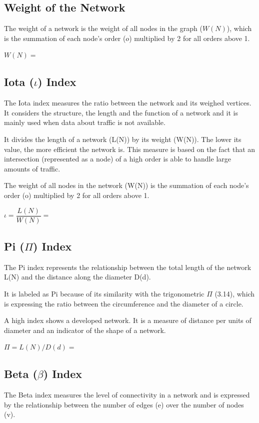         \subsection{Weight of the Network}
        The weight of a network is the weight of all nodes in the graph ($W(N)$), which is the summation 
        of each node's order ($o$) multiplied by 2 for all orders above 1.
        
        $W(N)=$
        \subsection{Iota ($\iota$) Index}
        The Iota index measures the ratio between the network and its weighed vertices. 
        It considers the structure, the length and the function 
        of a network and it is mainly used when data about traffic 
        is not available. 
        
        It divides the length of a network (L(N)) by its weight (W(N)). 
        The lower its value, the more efficient the network is. 
        This measure is based on the fact that an intersection 
        (represented as a node) of a high order is able to handle 
        large amounts of traffic. 
        
        The weight of all nodes in the network (W(N)) is the summation 
        of each node's order (o) multiplied by 2 for all orders above 1.
        
        $\iota=\dfrac{L(N)}{W(N)}=$
        \subsection{Pi ($\Pi$) Index}
        The Pi index represents the relationship between the 
        total length of the network L(N)
        and the distance along the diameter D(d). 
        
        It is labeled as Pi because of its similarity with the 
        trigonometric $\Pi$ (3.14), which is expressing the ratio between 
        the circumference and the diameter of a circle. 
        
        A high index shows a developed network. It is a measure 
        of distance per units of diameter and an indicator of 
        the  shape of a network.
        
        $\Pi=L(N)/D(d)=$
        \subsection{Beta ($\beta$) Index}
        The Beta index
        measures the level of connectivity in a network and is 
        expressed by the relationship between the number of 
        edges (e) over the number of nodes (v). 
        
